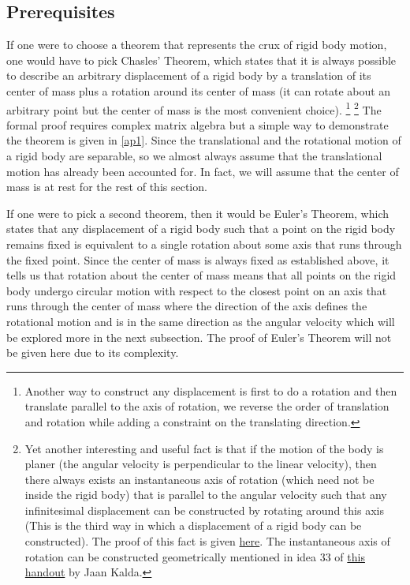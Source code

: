 \documentclass[a4paper,12pt]{report}
\begin{document}
\subsection{Prerequisites}
If one were to choose a theorem that represents the crux of rigid body motion, one would have to pick Chasles' Theorem, which states that it is always possible to describe an arbitrary displacement of a rigid body by a translation of its center of mass plus a rotation around its center of mass (it can rotate about an arbitrary point but the center of mass is the most convenient choice). \footnote{Another way to construct any displacement is first to do a rotation and then translate parallel to the axis of rotation, we reverse the order of translation and rotation while adding a constraint on the translating direction.} \footnote{Yet another interesting and useful fact is that if the motion of the body is planer (\ie the angular velocity is perpendicular to the linear velocity), then there always exists an instantaneous axis of rotation (which need not be inside the rigid body) that is parallel to the angular velocity such that any infinitesimal displacement can be constructed by rotating around this axis (This is the third way in which a displacement of a rigid body can be constructed). The proof of this fact is given \href{https://physics.stackexchange.com/q/541554}{here}. The instantaneous axis of rotation can be constructed geometrically mentioned in idea 33 of \href{https://www.ioc.ee/~kalda/ipho/kin_ENG.pdf}{this handout} by Jaan Kalda.}  The formal proof requires complex matrix algebra but a simple way to demonstrate the theorem is given in \cref{ap1}. Since the translational and the rotational motion of a rigid body are separable, so we almost always assume that the translational motion has already been accounted for. In fact, we will assume that the center of mass is at rest for the rest of this section.

If one were to pick a second theorem, then it would be Euler's Theorem, which states that any displacement of a rigid body such that a point on the rigid body remains fixed is equivalent to a single rotation about some axis that runs through the fixed point. Since the center of mass is always fixed as established above, it tells us that rotation about the center of mass means that all points on the rigid body undergo circular motion with respect to the closest point on an axis that runs through the center of mass where the direction of the axis defines the rotational motion and is in the same direction as the angular velocity which will be explored more in the next subsection. The proof of Euler's Theorem will not be given here due to its complexity.
\end{document}
